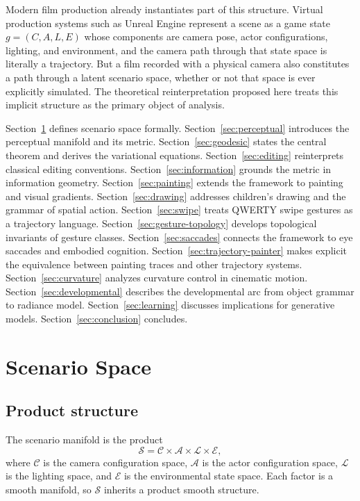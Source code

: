 \documentclass[12pt,a4paper]{article}
\theoremstyle{plain}
\theoremstyle{definition}
\begin{document}
Modern film production already instantiates part of this structure. Virtual
production systems such as Unreal Engine represent a scene as a game state
$g = (C, A, L, E)$ whose components are camera pose, actor configurations,
lighting, and environment, and the camera path through that state space is
literally a trajectory. But a film recorded with a physical camera also
constitutes a path through a latent scenario space, whether or not that space
is ever explicitly simulated. The theoretical reinterpretation proposed here
treats this implicit structure as the primary object of analysis.

Section~\ref{sec:scenario} defines scenario space formally. Section~\ref{sec:perceptual}
introduces the perceptual manifold and its metric. Section~\ref{sec:geodesic}
states the central theorem and derives the variational equations.
Section~\ref{sec:editing} reinterprets classical editing conventions.
Section~\ref{sec:information} grounds the metric in information geometry.
Section~\ref{sec:painting} extends the framework to painting and visual
gradients. Section~\ref{sec:drawing} addresses children's drawing and the
grammar of spatial action. Section~\ref{sec:swipe} treats QWERTY swipe gestures
as a trajectory language. Section~\ref{sec:gesture-topology} develops
topological invariants of gesture classes. Section~\ref{sec:saccades} connects
the framework to eye saccades and embodied cognition.
Section~\ref{sec:trajectory-painter} makes explicit the equivalence between
painting traces and other trajectory systems.
Section~\ref{sec:curvature} analyzes curvature control in cinematic motion.
Section~\ref{sec:developmental} describes the developmental arc from object
grammar to radiance model. Section~\ref{sec:learning} discusses implications
for generative models. Section~\ref{sec:conclusion} concludes.

\section{Scenario Space}
\label{sec:scenario}

\subsection{Product structure}

The scenario manifold is the product
\[
\mathcal{S}
= \mathcal{C} \times \mathcal{A} \times \mathcal{L} \times \mathcal{E},
\]
where $\mathcal{C}$ is the camera configuration space, $\mathcal{A}$ is the
actor configuration space, $\mathcal{L}$ is the lighting space, and
$\mathcal{E}$ is the environmental state space. Each factor is a smooth
manifold, so $\mathcal{S}$ inherits a product smooth structure.
\end{document}
